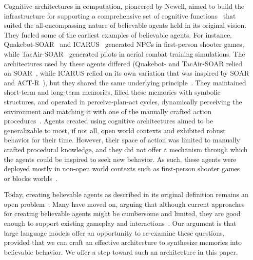 Cognitive architectures in computation, pioneered by Newell, aimed to build the infrastructure for supporting a comprehensive set of cognitive functions~\cite{14_newell1990unified} that suited the all-encompassing nature of believable agents held in its original vision. They fueled some of the earliest examples of believable agents. For instance, Quakebot-SOAR~\cite{54_Laird2000It} and ICARUS~\cite{33_LangleyIcarus, 34_Choi2021Believable} generated NPCs in first-person shooter games, while TacAir-SOAR~\cite{55_Pew1998Modeling} generated pilots in aerial combat training simulations. The architectures used by these agents differed (Quakebot- and TacAir-SOAR relied on SOAR~\cite{56_Laird2012Soar}, while ICARUS relied on its own variation that was inspired by SOAR and ACT-R~\cite{57_Anderson1993Rules}), but they shared the same underlying principle~\cite{58_Laird2017Standard}. They maintained short-term and long-term memories, filled these memories with symbolic structures, and operated in perceive-plan-act cycles, dynamically perceiving the environment and matching it with one of the manually crafted action procedures~\cite{32_Umarov2012Believable, 36_Laird2001Knows}. Agents created using cognitive architectures aimed to be generalizable to most, if not all, open world contexts and exhibited robust behavior for their time. However, their space of action was limited to manually crafted procedural knowledge, and they did not offer a mechanism through which the agents could be inspired to seek new behavior. As such, these agents were deployed mostly in non-open world contexts such as first-person shooter games~\cite{54_Laird2000It, 34_Choi2021Believable} or blocks worlds~\cite{33_LangleyIcarus}.

Today, creating believable agents as described in its original definition remains an open problem~\cite{25_yannakakis2012game, 6_riedl2012interactive}. Many have moved on, arguing that although current approaches for creating believable agents might be cumbersome and limited, they are good enough to support existing gameplay and interactions~\cite{25_yannakakis2012game, 52_Champandard2012Tutorial, 53_Nareyek2007Game}. Our argument is that large language models offer an opportunity to re-examine these questions, provided that we can craft an effective architecture to synthesize memories into believable behavior. We offer a step toward such an architecture in this paper. 


